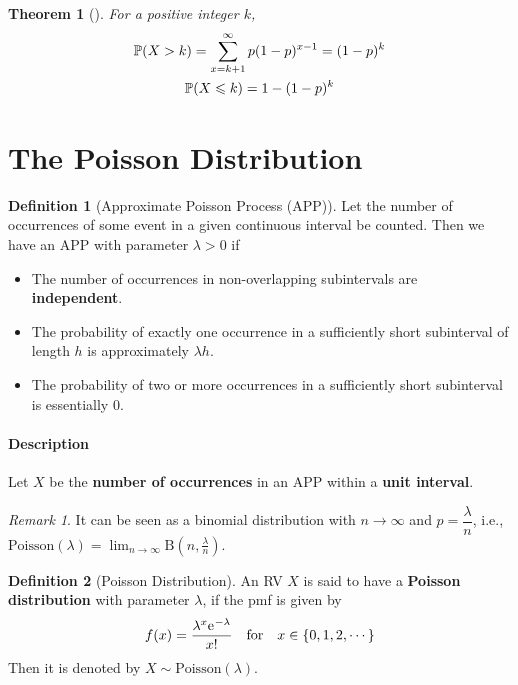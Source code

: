 \documentclass[10pt,UTF8]{article}
\newenvironment{definition box}
{\begin{tcolorbox}[colback=blue!5!white,colframe=blue!75!black,parbox=false,before upper=\par,before lower=\par]}
{\end{tcolorbox}}
\newenvironment{theorem box}
{\begin{tcolorbox}[colback=yellow!5!white,colframe=yellow!75!black,parbox=false,before upper=\par,before lower=\par]}
{\end{tcolorbox}}
\theoremstyle{definition}
\newtheorem{definition inner}{Definition}[section]
\newenvironment{definition}[1][]
{\begin{definition box}\begin{definition inner}[#1]\hfill\par}
{\end{definition inner}\end{definition box}}
\theoremstyle{plain}
\newtheorem{theorem inner}{Theorem}[section]
\newenvironment{theorem}[1][]
{\begin{theorem box}\begin{theorem inner}[#1]\hfill\par}
{\end{theorem inner}\end{theorem box}}
\theoremstyle{definition}
\newtheorem*{proof inner}{\textit{Proof}}
\theoremstyle{remark}
\newtheorem*{remark}{\textit{Remark}}
\newcommand{\e}{\mathrm{e}{\mkern 1 mu}}
\newcommand{\Prob}{\mathbb{P}\qty}
\begin{document}
\begin{theorem}
    For a positive integer $k$,
    \begin{gather*}
        \Prob(X > k) = \sum_{x=k+1}^{\infty} p(1-p)^{x-1} = (1-p)^k \\
        \Prob(X \leqslant k) = 1 - (1-p)^k
    \end{gather*}
\end{theorem}


\section{The Poisson Distribution}

\begin{definition}[Approximate Poisson Process (APP)]
    Let the number of occurrences of some event in a given continuous interval be counted.
    Then we have an APP with parameter $\lambda > 0$ if
    \begin{itemize}
        \item The number of occurrences in non-overlapping subintervals are \textbf{independent}.
        \item The probability of exactly one occurrence in a
        sufficiently short subinterval of length $h$ is
        approximately $\lambda h$.
        \item The probability of two or more occurrences in a
        sufficiently short subinterval is essentially $0$.
    \end{itemize}
\end{definition}

\paragraph{Description}
Let $X$ be the \textbf{number of occurrences} in an APP
within a \textbf{unit interval}.

\begin{remark}
    It can be seen as a binomial distribution
    with $n\to\infty$ and $p=\dfrac{\lambda}{n}$,
    i.e., $\displaystyle \mathrm{Poisson}(\lambda) = 
    \lim_{n\to\infty} \mathrm{B}(n,\frac{\lambda}{n})$.
\end{remark}

\begin{definition}[Poisson Distribution]
    An RV $X$ is said to have a \textbf{Poisson distribution} with parameter $\lambda$,
    if the pmf is given by
    \begin{equation*}
        f(x) = \frac{\lambda^x \e^{-\lambda}}{x!} \qfor x\in\{0,1,2,\cdots\}
    \end{equation*}
    Then it is denoted by $X \sim \mathrm{Poisson}(\lambda)$.
\end{definition}
\end{document}

